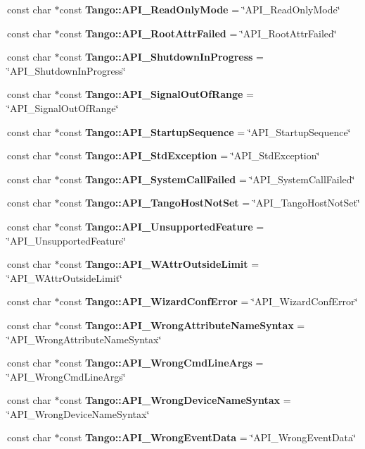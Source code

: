 \begin{DoxyCompactItemize}
const char $\ast$const {\bf Tango\-::\-A\-P\-I\-\_\-\-Read\-Only\-Mode} = \char`\"{}A\-P\-I\-\_\-\-Read\-Only\-Mode\char`\"{}
\item 
const char $\ast$const {\bf Tango\-::\-A\-P\-I\-\_\-\-Root\-Attr\-Failed} = \char`\"{}A\-P\-I\-\_\-\-Root\-Attr\-Failed\char`\"{}
\item 
const char $\ast$const {\bf Tango\-::\-A\-P\-I\-\_\-\-Shutdown\-In\-Progress} = \char`\"{}A\-P\-I\-\_\-\-Shutdown\-In\-Progress\char`\"{}
\item 
const char $\ast$const {\bf Tango\-::\-A\-P\-I\-\_\-\-Signal\-Out\-Of\-Range} = \char`\"{}A\-P\-I\-\_\-\-Signal\-Out\-Of\-Range\char`\"{}
\item 
const char $\ast$const {\bf Tango\-::\-A\-P\-I\-\_\-\-Startup\-Sequence} = \char`\"{}A\-P\-I\-\_\-\-Startup\-Sequence\char`\"{}
\item 
const char $\ast$const {\bf Tango\-::\-A\-P\-I\-\_\-\-Std\-Exception} = \char`\"{}A\-P\-I\-\_\-\-Std\-Exception\char`\"{}
\item 
const char $\ast$const {\bf Tango\-::\-A\-P\-I\-\_\-\-System\-Call\-Failed} = \char`\"{}A\-P\-I\-\_\-\-System\-Call\-Failed\char`\"{}
\item 
const char $\ast$const {\bf Tango\-::\-A\-P\-I\-\_\-\-Tango\-Host\-Not\-Set} = \char`\"{}A\-P\-I\-\_\-\-Tango\-Host\-Not\-Set\char`\"{}
\item 
const char $\ast$const {\bf Tango\-::\-A\-P\-I\-\_\-\-Unsupported\-Feature} = \char`\"{}A\-P\-I\-\_\-\-Unsupported\-Feature\char`\"{}
\item 
const char $\ast$const {\bf Tango\-::\-A\-P\-I\-\_\-\-W\-Attr\-Outside\-Limit} = \char`\"{}A\-P\-I\-\_\-\-W\-Attr\-Outside\-Limit\char`\"{}
\item 
const char $\ast$const {\bf Tango\-::\-A\-P\-I\-\_\-\-Wizard\-Conf\-Error} = \char`\"{}A\-P\-I\-\_\-\-Wizard\-Conf\-Error\char`\"{}
\item 
const char $\ast$const {\bf Tango\-::\-A\-P\-I\-\_\-\-Wrong\-Attribute\-Name\-Syntax} = \char`\"{}A\-P\-I\-\_\-\-Wrong\-Attribute\-Name\-Syntax\char`\"{}
\item 
const char $\ast$const {\bf Tango\-::\-A\-P\-I\-\_\-\-Wrong\-Cmd\-Line\-Args} = \char`\"{}A\-P\-I\-\_\-\-Wrong\-Cmd\-Line\-Args\char`\"{}
\item 
const char $\ast$const {\bf Tango\-::\-A\-P\-I\-\_\-\-Wrong\-Device\-Name\-Syntax} = \char`\"{}A\-P\-I\-\_\-\-Wrong\-Device\-Name\-Syntax\char`\"{}
\item 
const char $\ast$const {\bf Tango\-::\-A\-P\-I\-\_\-\-Wrong\-Event\-Data} = \char`\"{}A\-P\-I\-\_\-\-Wrong\-Event\-Data\char`\"{}

\end{DoxyCompactItemize}

